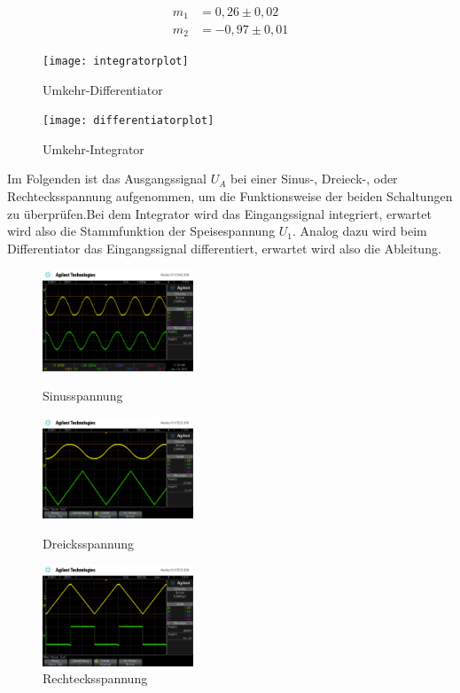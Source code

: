 \documentclass{scrartcl}
\begin{document}
 \begin{align}
   m_1&=0,26\pm0,02\\
   m_2&=-0,97\pm0,01
 \end{align}
\begin{figure}[!h]
\centering
\texttt{[image: integratorplot]}
\caption{Umkehr-Differentiator}
\label{dif}
\end{figure}
\begin{figure}[!h]
\centering
\texttt{[image: differentiatorplot]}
\caption{Umkehr-Integrator}
\label{int}
\end{figure}
\newpage
\noindent
Im Folgenden ist das Ausgangssignal $U_A$ bei einer Sinus-, Dreieck-, oder Rechtecksspannung aufgenommen, um die Funktionsweise der beiden Schaltungen zu überprüfen.Bei dem Integrator wird das Eingangssignal integriert, erwartet wird also die Stammfunktion der Speisespannung $U_1$. Analog dazu wird beim Differentiator das Eingangssignal differentiert, erwartet wird also die Ableitung.
\begin{figure}[H]%
\centering
\includegraphics[width=0.4\textwidth]{aufnahmen_neu/scope_187.png}
\caption{Sinusspannung }
\label{verstaerker}

\includegraphics[width=0.4\textwidth]{aufnahmen_neu/scope_189.png}
\caption{Dreicksspannung}
\label{verstaerker}

\includegraphics[width=0.4\textwidth]{aufnahmen_neu/scope_188.png}
\caption{Rechtecksspannung}
\label{verstaerker}

\end{figure}
\end{document}
